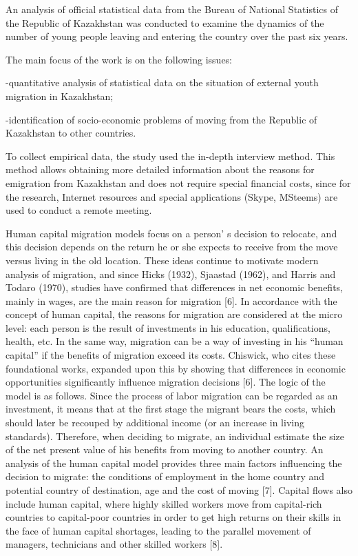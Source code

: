 An analysis of official statistical data from the Bureau of National
Statistics of the Republic of Kazakhstan was conducted to examine the
dynamics of the number of young people leaving and entering the country
over the past six years.

The main focus of the work is on the following issues:

-quantitative analysis of statistical data on the situation of external
youth migration in Kazakhstan;

-identification of socio-economic problems of moving from the Republic
of Kazakhstan to other countries.

To collect empirical data, the study used the in-depth interview method.
This method allows obtaining more detailed information about the reasons
for emigration from Kazakhstan and does not require special financial
costs, since for the research, Internet resources and special
applications (Skype, MSteems) are used to conduct a remote meeting.

Human capital migration models focus on a person' s
decision to relocate, and this decision depends on the return he or she
expects to receive from the move versus living in the old location.
These ideas continue to motivate modern analysis of migration, and since
Hicks (1932), Sjaastad (1962), and Harris and Todaro (1970), studies
have confirmed that differences in net economic benefits, mainly in
wages, are the main reason for migration {[}6{]}. In accordance with the
concept of human capital, the reasons for migration are considered at
the micro level: each person is the result of investments in his
education, qualifications, health, etc. In the same way, migration can
be a way of investing in his ``human capital'' if the benefits of
migration exceed its costs. Chiswick, who cites these foundational
works, expanded upon this by showing that differences in economic
opportunities significantly influence migration decisions {[}6{]}. The
logic of the model is as follows. Since the process of labor migration
can be regarded as an investment, it means that at the first stage the
migrant bears the costs, which should later be recouped by additional
income (or an increase in living standards). Therefore, when deciding to
migrate, an individual estimate the size of the net present value of his
benefits from moving to another country. An analysis of the human
capital model provides three main factors influencing the decision to
migrate: the conditions of employment in the home country and potential
country of destination, age and the cost of moving {[}7{]}. Capital
flows also include human capital, where highly skilled workers move from
capital-rich countries to capital-poor countries in order to get high
returns on their skills in the face of human capital shortages, leading
to the parallel movement of managers, technicians and other skilled
workers {[}8{]}.

